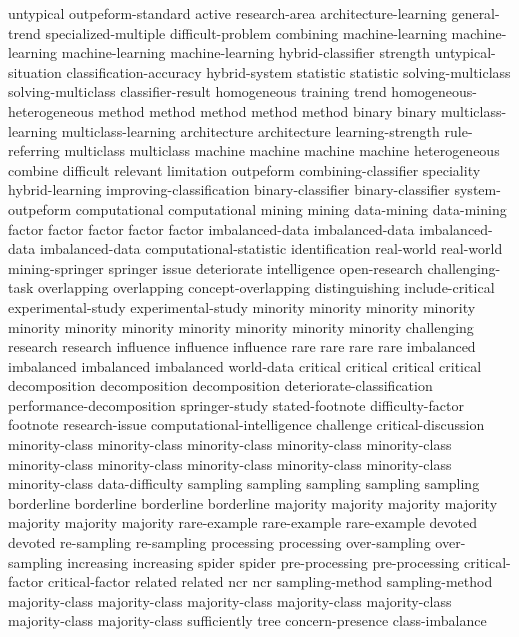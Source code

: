 untypical	
outpeform-standard	
active	
research-area	
architecture-learning	
general-trend	
specialized-multiple	
difficult-problem	
combining	
machine-learning	machine-learning	machine-learning	machine-learning	
hybrid-classifier	
strength	
untypical-situation	
classification-accuracy	
hybrid-system	
statistic	statistic	
solving-multiclass	solving-multiclass	
classifier-result	
homogeneous	
training	
trend	
homogeneous-heterogeneous	
method	method	method	method	method	
binary	binary	
multiclass-learning	multiclass-learning	
architecture	architecture	
learning-strength	
rule-referring	
multiclass	multiclass	
machine	machine	machine	machine	
heterogeneous	
combine	
difficult	
relevant	
limitation	
outpeform	
combining-classifier	
speciality	
hybrid-learning	
improving-classification	
binary-classifier	binary-classifier	
system-outpeform	
computational	computational	
mining	mining	
data-mining	data-mining	
factor	factor	factor	factor	factor	
imbalanced-data	imbalanced-data	imbalanced-data	imbalanced-data	
computational-statistic	
identification	
real-world	real-world	
mining-springer	
springer	
issue	
deteriorate	
intelligence	
open-research	
challenging-task	
overlapping	overlapping	
concept-overlapping	
distinguishing	
include-critical	
experimental-study	experimental-study	
minority	minority	minority	minority	minority	minority	minority	minority	minority	minority	minority	
challenging	
research	research	
influence	influence	influence	
rare	rare	rare	rare	
imbalanced	imbalanced	imbalanced	imbalanced	
world-data	
critical	critical	critical	critical	
decomposition	decomposition	decomposition	
deteriorate-classification	
performance-decomposition	
springer-study	
stated-footnote	
difficulty-factor	
footnote	
research-issue	
computational-intelligence	
challenge	
critical-discussion	
minority-class	minority-class	minority-class	minority-class	minority-class	minority-class	minority-class	minority-class	minority-class	minority-class	minority-class	
data-difficulty	
sampling	sampling	sampling	sampling	sampling	
borderline	borderline	borderline	borderline	
majority	majority	majority	majority	majority	majority	majority	
rare-example	rare-example	rare-example	
devoted	devoted	
re-sampling	re-sampling	
processing	processing	
over-sampling	over-sampling	
increasing	increasing	
spider	spider	
pre-processing	pre-processing	
critical-factor	critical-factor	
related	related	
ncr	ncr	
sampling-method	sampling-method	
majority-class	majority-class	majority-class	majority-class	majority-class	majority-class	majority-class	
sufficiently	
tree	
concern-presence	
class-imbalance	
